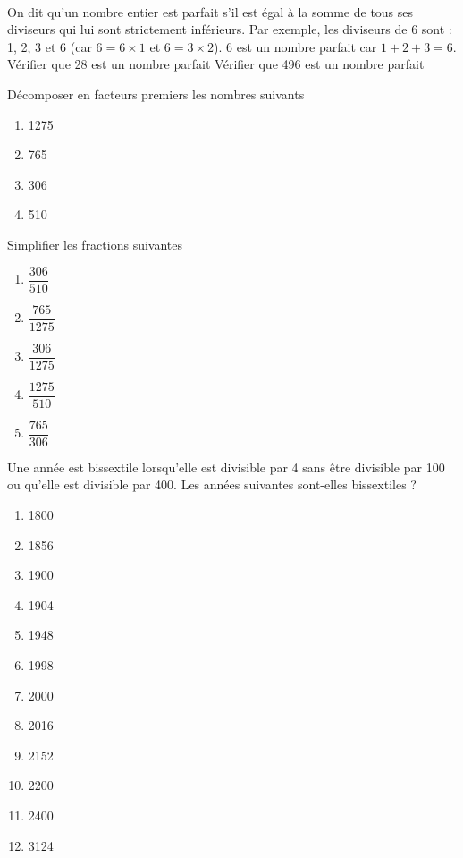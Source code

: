 \documentclass[../Cours.tex]{subfiles}
\begin{document}
\begin{questions}
    \exercice\\ On dit qu'un nombre entier est parfait s'il est égal à la somme de tous ses diviseurs qui lui sont strictement inférieurs. Par exemple, les diviseurs de 6 sont : 1, 2, 3 et 6 (car $6 = 6 \times 1$ et $6 = 3 \times 2$). 6 est un nombre parfait car $1+2+3 = 6$.
        \question Vérifier que 28 est un nombre parfait
        \question Vérifier que 496 est un nombre parfait
        
        
    \exercice
        \question Décomposer en facteurs premiers les nombres suivants
        \vspace{-1ex}
        \begin{multicols}{4}
        \begin{enumerate}[label={\alph*)}]
            \item 1275
            \item 765
            \item 306
            \item 510
        \end{enumerate}
        \end{multicols}
        \question Simplifier les fractions suivantes
        \begin{multicols}{5}
        \begin{enumerate}[label={\alph*)}]
            \item $\dfrac{306}{510}$
            \item $\dfrac{765}{1275}$
            \item $\dfrac{306}{1275}$
            \item $\dfrac{1275}{510}$
            \item $\dfrac{765}{306}$
        \end{enumerate}
        \end{multicols}

    \exercice Une année est bissextile lorsqu'elle est divisible par 4 sans être divisible par 100 ou qu'elle est divisible par 400. Les années suivantes sont-elles bissextiles ?
    \begin{multicols}{6}
    \begin{enumerate}[label={\alph*)}]
        \item 1800
        \item 1856
        \item 1900
        \item 1904
        \item 1948
        \item 1998
        \item 2000
        \item 2016
        \item 2152
        \item 2200
        \item 2400
        \item 3124
    \end{enumerate}
    \end{multicols}

\end{questions}
\end{document}
